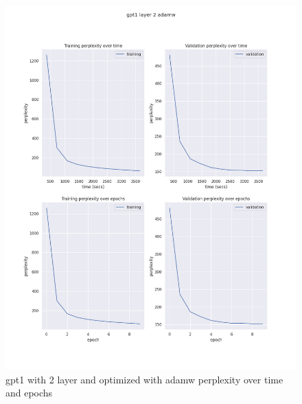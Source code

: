\documentclass[12pt]{article}
\theoremstyle{definition}
\begin{document}
\begin{figure}[H]
     \centering
     \includegraphics[scale=0.4]{gpt1_layer_2_adamw.png}
     \caption{gpt1 with 2 layer and optimized with adamw perplexity over time and epochs}
\end{figure}
\end{document}
